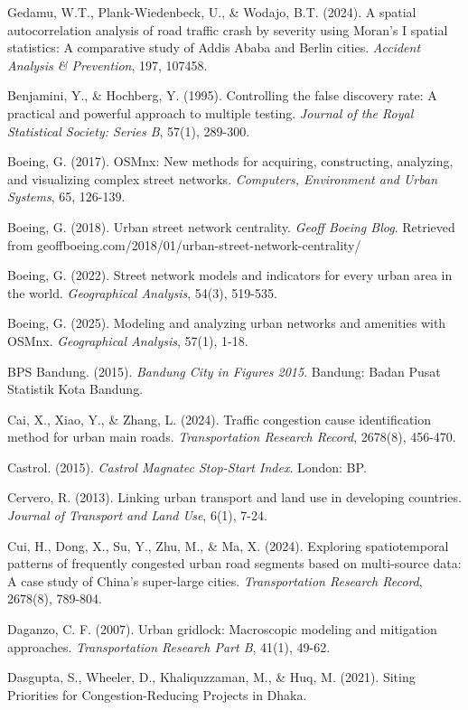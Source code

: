 \documentclass[12pt,a4paper]{article}
\begin{document}
Gedamu, W.T., Plank-Wiedenbeck, U., \& Wodajo, B.T. (2024). A spatial autocorrelation analysis of road traffic crash by severity using Moran's I spatial statistics: A comparative study of Addis Ababa and Berlin cities. \emph{Accident Analysis \& Prevention}, 197, 107458.

Benjamini, Y., \& Hochberg, Y. (1995). Controlling the false discovery rate: A practical and powerful approach to multiple testing. \emph{Journal of the Royal Statistical Society: Series B}, 57(1), 289-300.

Boeing, G. (2017). OSMnx: New methods for acquiring, constructing, analyzing, and visualizing complex street networks. \emph{Computers, Environment and Urban Systems}, 65, 126-139.

Boeing, G. (2018). Urban street network centrality. \emph{Geoff Boeing Blog}. Retrieved from geoffboeing.com/2018/01/urban-street-network-centrality/

Boeing, G. (2022). Street network models and indicators for every urban area in the world. \emph{Geographical Analysis}, 54(3), 519-535.

Boeing, G. (2025). Modeling and analyzing urban networks and amenities with OSMnx. \emph{Geographical Analysis}, 57(1), 1-18.

BPS Bandung. (2015). \emph{Bandung City in Figures 2015}. Bandung: Badan Pusat Statistik Kota Bandung.

Cai, X., Xiao, Y., \& Zhang, L. (2024). Traffic congestion cause identification method for urban main roads. \emph{Transportation Research Record}, 2678(8), 456-470.

Castrol. (2015). \emph{Castrol Magnatec Stop-Start Index}. London: BP.

Cervero, R. (2013). Linking urban transport and land use in developing countries. \emph{Journal of Transport and Land Use}, 6(1), 7-24.

Cui, H., Dong, X., Su, Y., Zhu, M., \& Ma, X. (2024). Exploring spatiotemporal patterns of frequently congested urban road segments based on multi-source data: A case study of China's super-large cities. \emph{Transportation Research Record}, 2678(8), 789-804.

Daganzo, C. F. (2007). Urban gridlock: Macroscopic modeling and mitigation approaches. \emph{Transportation Research Part B}, 41(1), 49-62.

Dasgupta, S., Wheeler, D., Khaliquzzaman, M., \& Huq, M. (2021). Siting Priorities for Congestion-Reducing Projects in Dhaka.
\end{document}
